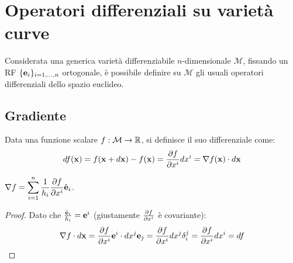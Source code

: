 \section{Operatori differenziali su varietà curve}

Considerata una generica varietà differenziabile $ n $-dimensionale $ \mathcal{M} $, fissando un RF $ \{\mathbf{e}_i\}_{i = 1, \dots, n} $ ortogonale, è possibile definire su $ \mathcal{M} $ gli usuali operatori differenziali dello spazio euclideo.

\subsection{Gradiente}

Data una funzione scalare $ f : \mathcal{M} \rightarrow \mathbb{R} $, si definisce il suo differenziale come:
\begin{equation}
	df(\mathbf{x}) = f(\mathbf{x} + d\mathbf{x}) - f(\mathbf{x}) = \frac{\partial f}{\partial x^i}dx^i = \nabla f(\mathbf{x}) \cdot d\mathbf{x}
	\label{eq:3.21}
\end{equation}

\begin{proposition}
	$ \nabla f = \displaystyle\sum_{i = 1}^{n} \frac{1}{h_i} \frac{\partial f}{\partial x^i} \hat{\mathbf{e}}_i $.
\end{proposition}
\begin{proof}
	Dato che $ \frac{\hat{\mathbf{e}}_i}{h_i} = \mathbf{e}^i $ (giustamente $ \frac{\partial f}{\partial x^i} $ è covariante):
	\begin{equation*}
		\nabla f \cdot d\mathbf{x} = \frac{\partial f}{\partial x^i} \mathbf{e}^i \cdot dx^j \mathbf{e}_j = \frac{\partial f}{\partial x^i} dx^j \delta^j_i = \frac{\partial f}{\partial x^i} dx^i = df
	\end{equation*}
\end{proof}










